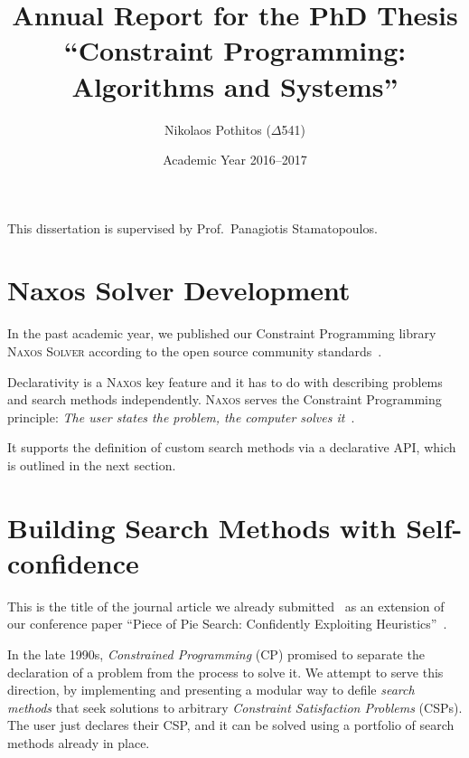 \documentclass[a4paper]{article}
\begin{document}
\title{Annual Report for the PhD Thesis ``Constraint
       Programming: Algorithms and Systems''}

\author{Nikolaos Pothitos ($\Delta$541)}


\date{Academic Year 2016--2017}

\maketitle

This dissertation is supervised by Prof.~Panagiotis
Stamatopoulos.


\section{Naxos Solver Development}

In the past academic year, we published our Constraint
Programming library \textsc{Naxos Solver} according to the
open source community standards~\cite{Naxos}.

Declarativity is a \textsc{Naxos} key feature and it has to
do with describing problems and search methods
independently. \textsc{Naxos} serves the Constraint
Programming principle: \emph{The user states the problem,
the computer solves it}~\cite{Freuder2014}.

It supports the definition of custom search methods via a
declarative API, which is outlined in the next section.


\section{Building Search Methods with Self-confidence}

This is the title of the journal article we already
submitted~\cite{Pothitos2017} as an extension of our
conference paper ``Piece of Pie Search: Confidently
Exploiting Heuristics''~\cite{Pothitos2016-PoPS}.

In the late 1990s, \emph{Constrained Programming} (CP)
promised to separate the declaration of a problem from the
process to solve it. We attempt to serve this direction, by
implementing and presenting a modular way to defile
\emph{search methods} that seek solutions to arbitrary
\emph{Constraint Satisfaction Problems} (CSPs). The user
just declares their CSP, and it can be solved using a
portfolio of search methods already in place.
\end{document}
